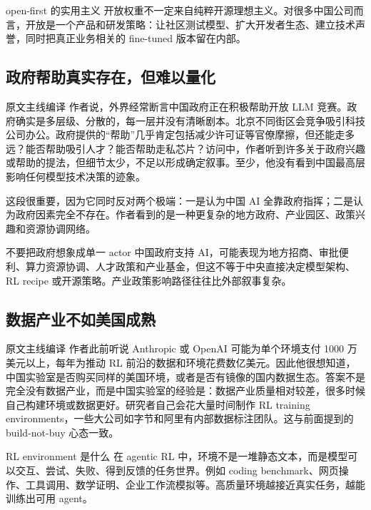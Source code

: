 \begin{importantbox}{open-first 的实用主义}
开放权重不一定来自纯粹开源理想主义。对很多中国公司而言，开放是一个产品和研发策略：让社区测试模型、扩大开发者生态、建立技术声誉，同时把真正业务相关的 fine-tuned 版本留在内部。
\end{importantbox}

\subsection{政府帮助真实存在，但难以量化}

\begin{translationbox}{原文主线编译}
作者说，外界经常断言中国政府正在积极帮助开放 LLM 竞赛。政府确实是多层级、分散的，每一层并没有清晰剧本。北京不同街区会竞争吸引科技公司办公。政府提供的``帮助''几乎肯定包括减少许可证等官僚摩擦，但还能走多远？能否帮助吸引人才？能否帮助走私芯片？访问中，作者听到许多关于政府兴趣或帮助的提法，但细节太少，不足以形成确定叙事。至少，他没有看到中国最高层影响任何模型技术决策的迹象。
\end{translationbox}

这段很重要，因为它同时反对两个极端：一是认为中国 AI 全靠政府指挥；二是认为政府因素完全不存在。作者看到的是一种更复杂的地方政府、产业园区、政策兴趣和资源协调网络。

\begin{warningbox}{不要把政府想象成单一 actor}
中国政府支持 AI，可能表现为地方招商、审批便利、算力资源协调、人才政策和产业基金，但这不等于中央直接决定模型架构、RL recipe 或开源策略。产业政策影响路径往往比外部叙事复杂。
\end{warningbox}

\subsection{数据产业不如美国成熟}

\begin{translationbox}{原文主线编译}
作者此前听说 Anthropic 或 OpenAI 可能为单个环境支付 1000 万美元以上，每年为推动 RL 前沿的数据和环境花费数亿美元。因此他很想知道，中国实验室是否购买同样的美国环境，或者是否有镜像的国内数据生态。答案不是完全没有数据产业，而是中国实验室的经验是：数据产业质量相对较差，很多时候自己构建环境或数据更好。研究者自己会花大量时间制作 RL training environments，一些大公司如字节和阿里有内部数据标注团队。这与前面提到的 build-not-buy 心态一致。
\end{translationbox}

\begin{knowledgebox}{RL environment 是什么}
在 agentic RL 中，环境不是一堆静态文本，而是模型可以交互、尝试、失败、得到反馈的任务世界。例如 coding benchmark、网页操作、工具调用、数学证明、企业工作流模拟等。高质量环境越接近真实任务，越能训练出可用 agent。
\end{knowledgebox}

